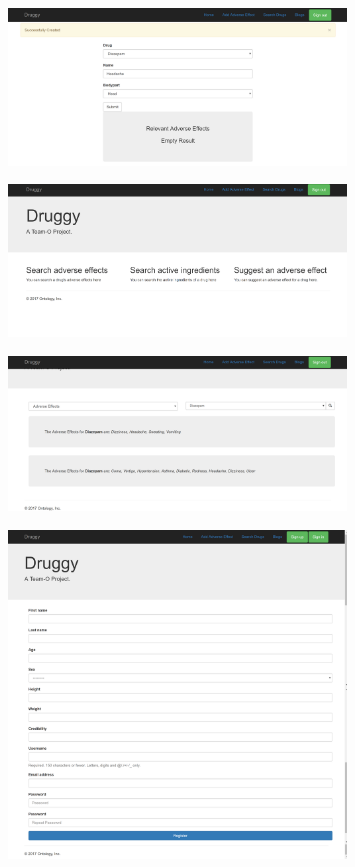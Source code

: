\documentclass[21pt,a4paper,notitlepage]{report}
\begin{document}
\begin{figure}
	\centering
	\includegraphics[width=0.8\textwidth]{scr1.png}
\end{figure}

\begin{figure}
	\centering
	\includegraphics[width=0.8\textwidth]{scr2.png}
\end{figure}

\begin{figure}
	\centering
	\includegraphics[width=0.8\textwidth]{scr3.png}
\end{figure}

\begin{figure}
	\centering
	\includegraphics[width=0.8\textwidth]{scr4.png}
\end{figure}




\end{document}
